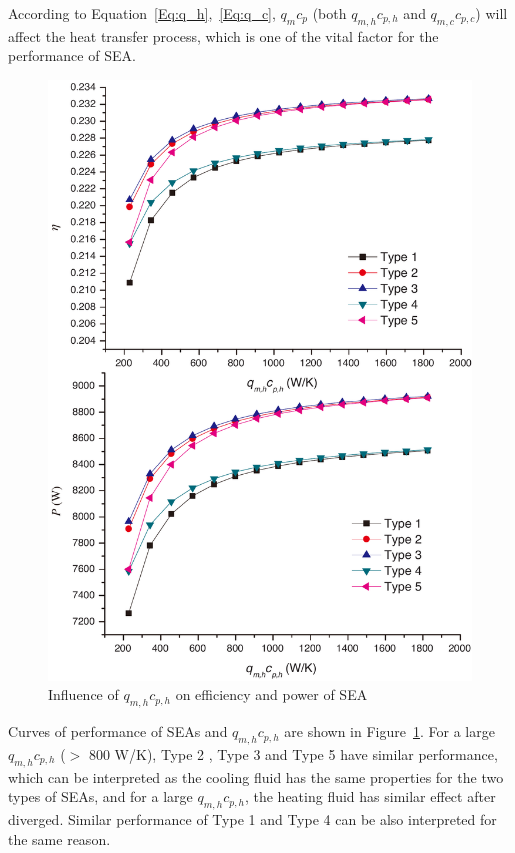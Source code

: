 \documentclass[review,3p,10t]{elsarticle}
\begin{document}
According to Equation~\ref{Eq:q_h},~\ref{Eq:q_c}, $q_mc_p$ (both $q_{m,h}c_{p,h}$ and $q_{m,c}c_{p,c}$) will affect the heat transfer process, which is one of the vital factor for the performance of SEA.


\noindent \begin{figure}[htbp]
\begin{center}
	\includegraphics[width = 0.7\columnwidth]{./graphics/qm_hcp_h}
	\caption{Influence of $q_{m,h}c_{p,h}$ on efficiency and power of SEA}
	\label{fig:qm_hcp_h}
\end{center}
\end{figure}

Curves of performance of SEAs and $q_{m,h}c_{p,h}$ are shown in Figure~\ref{fig:qm_hcp_h}.
For a large $q_{m,h}c_{p,h}$ ($>$ 800 W/K), Type 2 , Type 3 and Type 5 have similar performance, which can be interpreted as the cooling fluid has the same properties for the two types of SEAs, and for a large $q_{m,h}c_{p,h}$, the heating fluid has similar effect after diverged. Similar performance of Type 1 and Type 4 can be also interpreted for the same reason.
\end{document}
